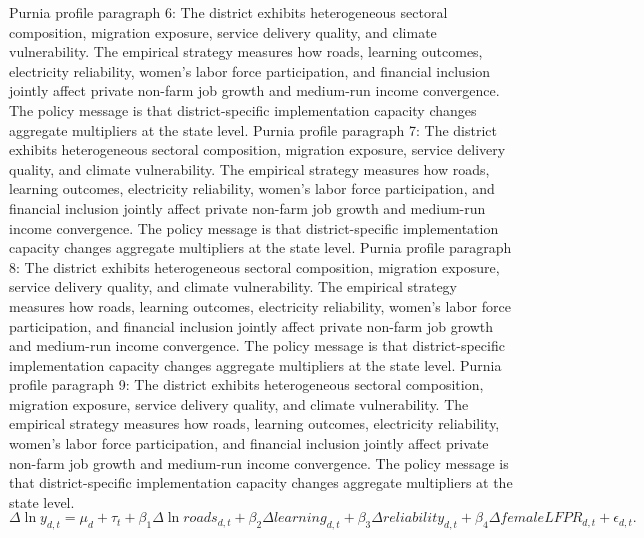 \documentclass[preprint,12pt]{elsarticle}
\begin{document}
Purnia profile paragraph 6: The district exhibits heterogeneous sectoral composition, migration exposure, service delivery quality, and climate vulnerability. The empirical strategy measures how roads, learning outcomes, electricity reliability, women's labor force participation, and financial inclusion jointly affect private non-farm job growth and medium-run income convergence. The policy message is that district-specific implementation capacity changes aggregate multipliers at the state level.
Purnia profile paragraph 7: The district exhibits heterogeneous sectoral composition, migration exposure, service delivery quality, and climate vulnerability. The empirical strategy measures how roads, learning outcomes, electricity reliability, women's labor force participation, and financial inclusion jointly affect private non-farm job growth and medium-run income convergence. The policy message is that district-specific implementation capacity changes aggregate multipliers at the state level.
Purnia profile paragraph 8: The district exhibits heterogeneous sectoral composition, migration exposure, service delivery quality, and climate vulnerability. The empirical strategy measures how roads, learning outcomes, electricity reliability, women's labor force participation, and financial inclusion jointly affect private non-farm job growth and medium-run income convergence. The policy message is that district-specific implementation capacity changes aggregate multipliers at the state level.
Purnia profile paragraph 9: The district exhibits heterogeneous sectoral composition, migration exposure, service delivery quality, and climate vulnerability. The empirical strategy measures how roads, learning outcomes, electricity reliability, women's labor force participation, and financial inclusion jointly affect private non-farm job growth and medium-run income convergence. The policy message is that district-specific implementation capacity changes aggregate multipliers at the state level.
\begin{equation}\Delta \ln y_{d,t}=\mu_d+\tau_t+\beta_1\Delta\ln roads_{d,t}+\beta_2\Delta learning_{d,t}+\beta_3\Delta reliability_{d,t}+\beta_4\Delta femaleLFPR_{d,t}+\epsilon_{d,t}.\end{equation}
\end{document}

